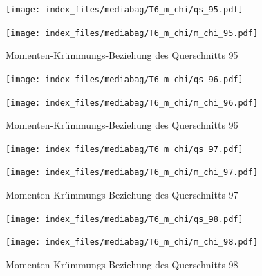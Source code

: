 \documentclass[
  11pt,
  letterpaper,
]{scrreprt}
\begin{document}
\begin{figure}[H]

\begin{minipage}{0.50\linewidth}
\texttt{[image: index\_files/mediabag/T6\_m\_chi/qs\_95.pdf]}\end{minipage}%
%
\begin{minipage}{0.50\linewidth}
\texttt{[image: index\_files/mediabag/T6\_m\_chi/m\_chi\_95.pdf]}\end{minipage}%

\caption{\label{fig-mchi_anhang}Momenten-Krümmungs-Beziehung des
Querschnitts 95}

\end{figure}%

\begin{figure}[H]

\begin{minipage}{0.50\linewidth}
\texttt{[image: index\_files/mediabag/T6\_m\_chi/qs\_96.pdf]}\end{minipage}%
%
\begin{minipage}{0.50\linewidth}
\texttt{[image: index\_files/mediabag/T6\_m\_chi/m\_chi\_96.pdf]}\end{minipage}%

\caption{\label{fig-mchi_anhang}Momenten-Krümmungs-Beziehung des
Querschnitts 96}

\end{figure}%

\begin{figure}[H]

\begin{minipage}{0.50\linewidth}
\texttt{[image: index\_files/mediabag/T6\_m\_chi/qs\_97.pdf]}\end{minipage}%
%
\begin{minipage}{0.50\linewidth}
\texttt{[image: index\_files/mediabag/T6\_m\_chi/m\_chi\_97.pdf]}\end{minipage}%

\caption{\label{fig-mchi_anhang}Momenten-Krümmungs-Beziehung des
Querschnitts 97}

\end{figure}%

\begin{figure}[H]

\begin{minipage}{0.50\linewidth}
\texttt{[image: index\_files/mediabag/T6\_m\_chi/qs\_98.pdf]}\end{minipage}%
%
\begin{minipage}{0.50\linewidth}
\texttt{[image: index\_files/mediabag/T6\_m\_chi/m\_chi\_98.pdf]}\end{minipage}%

\caption{\label{fig-mchi_anhang}Momenten-Krümmungs-Beziehung des
Querschnitts 98}

\end{figure}%
\end{document}
